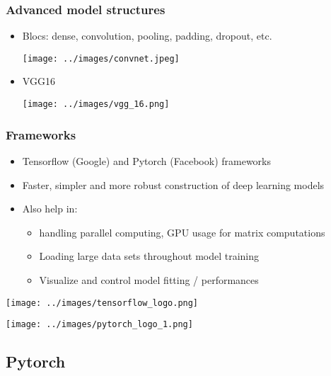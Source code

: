 \begin{frame}[fragile]
   \frametitle{Advanced model structures}
   \begin{itemize}
      \item Blocs: dense, convolution, pooling, padding, dropout, etc.
      \begin{center}
         \texttt{[image: ../images/convnet.jpeg]}
      \end{center}
      \item VGG16
      \begin{center}
         \texttt{[image: ../images/vgg\_16.png]}
      \end{center}
   \end{itemize}
\end{frame}



\begin{frame}[fragile]
   \frametitle{Frameworks}
   \begin{itemize}
      \item Tensorflow (Google) and Pytorch (Facebook) frameworks
      \item Faster, simpler and more robust construction of deep learning models
      \item Also help in:
      \begin{itemize}
         \item handling parallel computing, GPU usage for matrix computations
         \item Loading large data sets throughout model training
         \item Visualize and control model fitting / performances
      \end{itemize}
   \end{itemize}
   \begin{center}
      \texttt{[image: ../images/tensorflow\_logo.png]}
   \end{center}
   \begin{center}
      \texttt{[image: ../images/pytorch\_logo\_1.png]}
   \end{center}
\end{frame}


\subsection{Pytorch}


